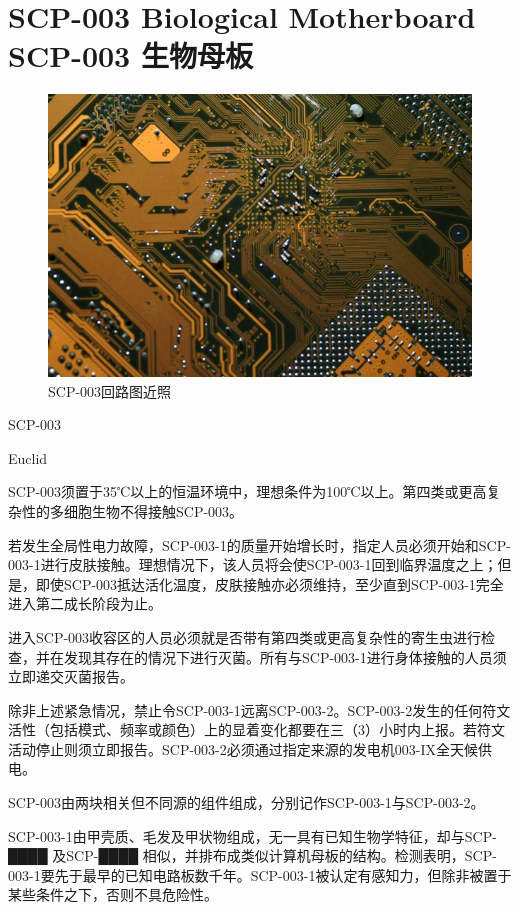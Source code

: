 \chapter[SCP-003 生物母板]{
	SCP-003 Biological Motherboard\\
	SCP-003 生物母板
}

\label{chap:SCP-003}

\begin{figure}[H]
	\centering
	\includegraphics[width=0.5\linewidth]{images/SCP-003.jpg}
	\caption*{SCP-003回路图近照}
\end{figure}

SCP-003

Euclid


SCP-003须置于35℃以上的恒温环境中，理想条件为100℃以上。第四类或更高复杂性的多细胞生物不得接触SCP-003。

若发生全局性电力故障，SCP-003-1的质量开始增长时，指定人员必须开始和SCP-003-1进行皮肤接触。理想情况下，该人员将会使SCP-003-1回到临界温度之上；但是，即使SCP-003抵达活化温度，皮肤接触亦必须维持，至少直到SCP-003-1完全进入第二成长阶段为止。

进入SCP-003收容区的人员必须就是否带有第四类或更高复杂性的寄生虫进行检查，并在发现其存在的情况下进行灭菌。所有与SCP-003-1进行身体接触的人员须立即递交灭菌报告。

除非上述紧急情况，禁止令SCP-003-1远离SCP-003-2。SCP-003-2发生的任何符文活性（包括模式、频率或颜色）上的显着变化都要在三（3）小时内上报。若符文活动停止则须立即报告。SCP-003-2必须通过指定来源的发电机003-IX全天候供电。

SCP-003由两块相关但不同源的组件组成，分别记作SCP-003-1与SCP-003-2。

SCP-003-1由甲壳质、毛发及甲状物组成，无一具有已知生物学特征，却与SCP-████ 及SCP-████ 相似，并排布成类似计算机母板的结构。检测表明，SCP-003-1要先于最早的已知电路板数千年。SCP-003-1被认定有感知力，但除非被置于某些条件之下，否则不具危险性。

